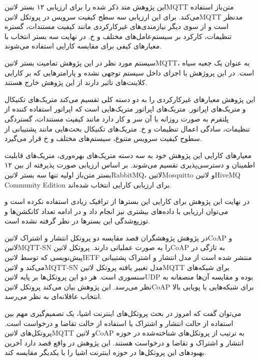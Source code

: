 این پژوهش متد ذکر شده را برای ارزیابی ۱۲ بستر ‌لاتین{MQTT} متن‌باز استفاده می‌کند. برای این ارزیابی سه سطح کیفیت سرویس در پروتکل ‌لاتین{MQTT}
مدنظر است و از سوی دیگر نیازمندی‌های غیرکارکردی مانند کیفیت مستندات، گستره تنظیمات، کارکرد بر سیستم‌عامل‌های مختلف و ‌خ. در نهایت سه بستر انتخاب
با معیارهای کیفی برای مقایسه کارایی استفاده می‌شوند.

سیستم مورد نظر در این پژوهش تمامیت بستر ‌لاتین{MQTT}، به عنوان یک جعبه سیاه است. در این پروژهش با اجزای داخل سیستم توجهی نشده و پارامترهایی که بر کارایی
کلاینت‌های تاثیر دارند از این پژوهش خارج هستند.

این پژوهش معیارهای غیرکارکردی را به دو دسته کلی تقسیم می‌کند متریک‌های تکنیکال و متریک‌های اپراتور. متریک‌های اپراتور متریک‌هایی است که اپراتور استفاده کننده از
پلتفرم به صورت روزانه با آن سر و کار دارد مانند کیفیت مستندات، گستردگی تنظیمات، سادگی اعمال تنظیمات و ‌خ. متریک‌های تکنیکال بحث‌هایی مانند پشتیبانی از سطوح
کیفیت سرویس متنوع، سیستم‌های مختلف و ‌خ قرار می‌گیرد.

معیارهای کارایی این پژوهش خود به سه دسته متریک‌های بهره‌وری، متریک‌های قابلیت اطمینان و دسترسی‌پذیری تقسیم می‌شوند.
بر اساس ارزیابی صورت پذیرفته از بین ۱۲ بستر متن‌باز اولیه تنها سه بستر ‌لاتین{RabbitMQ}، ‌لاتین{Mosquitto} و ‌لاتین{HiveMQ Community Edition}
برای ارزیابی کارایی انتخاب شده‌اند.

در نهایت این پژوهش برای کارایی این بسترها
از ترافیک زیادی استفاده نکرده است و می‌توان ارزیابی با داده‌های بیشتری نیز انجام داد و در ادامه تعداد کانکشن‌ها و توزیع‌شدگی این بسترها در نظر گرفته نشده است.



در پژوهش  پژوهشگران قصد مقایسه دو پروتکل انتشار و اشتراک ‌لاتین{CoAP} و ‌لاتین{MQTT-SN} را به صورت عملیاتی دارند.
پروتکل ‌لاتین{CoAP} به تازگی در پیش‌نویسی که توسط ‌لاتین{IETF} منتشر شده است از مدل انتشار و اشتراک پشتیبانی می‌کند و ‌لاتین{MQTT-SN}
مدل تغییر یافته پروتکل ‌لاتین{MQTT} برای شبکه‌های سنسوری است. هر دو این پروتکل‌ها بر پایه ‌لاتین{UDP} بوده و مقایسه آن‌ها منصفانه به نظر می‌رسد.
این پژوهش بیان می‌کند پروتکل ‌لاتین{CoAP} برای شبکه‌هایی با پویایی بالا انتخاب عاقلانه‌ای به نظر می‌رسد.

می‌توان گفت که امروز در بحث پروتکل‌های اینترنت اشیا، یک تصمیم‌گیری مهم بین استفاده از حالت انتشار و اشتراک یا استفاده از حالت تقاضا و درخواست است.
پروتکل‌های ‌لاتین{MQTT} و ‌لاتین{CoAP} به ترتیب از پروتکل‌های شناخته‌شده در حوزه انتشار و اشتراک و تقاضا و درخواست هستند.
این پژوهش در واقع قصد دارد آخرین بهبودهای این پروتکل‌ها در حوزه اینترنت اشیا را با یکدیگر مقایسه کند.


